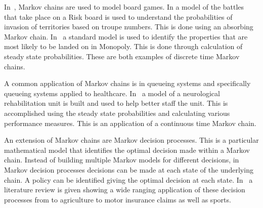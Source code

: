 In~\cite{tan1997markov, stewart1996monopoly}, Markov chains are used to model board games. In
\cite{tan1997markov} a model of the battles that take place on a Risk board is used
to understand the probabilities of invasion of territories based on troupe
numbers. This is done using an absorbing Markov chain. In~\cite{stewart1996monopoly} a
standard model is used to identify the properties that are most likely to be
landed on in Monopoly. This is done through calculation of steady state
probabilities. These are both examples of discrete time Markov chains.

A common application of Markov chains is in queueing systems and specifically
queueing systems applied to healthcare. In~\cite{griffiths2013modelling} a
model of a neurological rehabilitation unit is built and used to help better
staff the unit.  This is accomplished using the steady state probabilities and
calculating various performance measures.  This is an application of a
continuous time Markov chain.

An extension of Markov chains are Markov decision processes. This is a
particular mathematical model that identifies the optimal decision made within a
Markov chain.
Instead of building multiple Markov models for different decisions, in Markov
decision processes decisions can be made at each state of the underlying chain.
A policy can be identified giving the optimal decision at each state.
In~\cite{white1993survey} a literature review is given showing a wide
ranging application of these decision processes from to agriculture to motor
insurance claims as well as sports.
